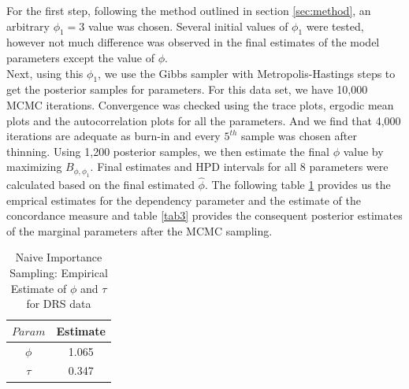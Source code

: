 \documentclass[11pt]{article}
\theoremstyle{remboldstyle}
\begin{document}
For the first step, following the method outlined in section \ref{sec:method}, an arbitrary $\phi_1 = 3$ value was chosen. Several initial values of $\phi_1$ were tested, however not much difference was observed in the final estimates of the model parameters except the value of $\phi$. \\
Next, using this $\phi_1$, we use the Gibbs sampler with Metropolis-Hastings steps to get the posterior samples for parameters. For this data set, we have 10,000 MCMC iterations. Convergence was checked using the trace plots, ergodic mean plots and the autocorrelation plots for all the parameters. And we find that 4,000 iterations are adequate as burn-in and every $5^{th}$ sample was chosen after thinning. Using 1,200 posterior samples, we then estimate the final $\phi$ value by maximizing $B_{\phi, \phi_1}$. Final estimates and HPD intervals for all 8 parameters were calculated based on the final estimated $\hat{\phi}$. The following table \ref{tab31} provides us the emprical estimates for the dependency parameter and the estimate of the concordance measure and table \ref{tab3} provides the consequent posterior estimates of the marginal parameters after the MCMC sampling.
\begin{table}[H]
\caption{Naive Importance Sampling: Empirical Estimate of $\phi$ and $\tau$ for DRS data}
\centering
\begin{tabular}{c c}
\hline
$Param$      & Estimate\\
\hline
$\phi$ & 1.065 \\
$\tau$ & 0.347\\
 \hline             
\end{tabular}
\label{tab31}
\end{table}
\end{document}
